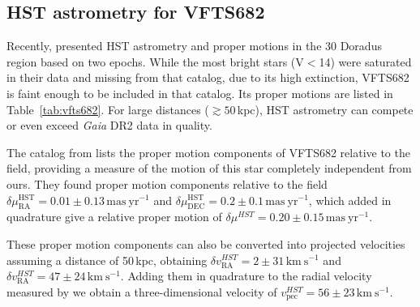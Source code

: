\documentclass[a4paper,fleqn,usenatbib]{mnras}
\newcommand{\kms}{{\,\mathrm{km\ s^{-1}}}}
\DeclareRobustCommand{\Tabref}[1]{Table~\ref{#1}}
\begin{document}
\subsection{HST astrometry for VFTS682}
Recently, \citet{platais:18} presented HST  astrometry and proper
motions in the 30 Doradus region based on two epochs. %
While the most bright stars (V$<$14) were saturated in
their data and missing from that catalog, due to its
high extinction, VFTS682 is faint enough
to be included in that catalog. Its proper motions are
listed in \Tabref{tab:vfts682}. For
large distances ($\gtrsim50$\,kpc), HST astrometry can compete or even
exceed \emph{Gaia} DR2 data in quality.

The catalog from \citet{platais:18} lists the proper motion
components of VFTS682 relative to the field, providing a
measure of the motion of this star completely independent from
ours. They found proper
motion components relative to the field
$\delta\mu_\mathrm{RA}^\mathrm{HST} = 0.01\pm0.13\,\mathrm{mas\
  yr^{-1}}$ and
$\delta\mu_\mathrm{DEC}^\mathrm{HST}=0.2\pm0.1\,\mathrm{mas\
  yr^{-1}}$, which added in quadrature give a relative proper motion of
$\delta \mu^{HST} =0.20 \pm 0.15\,\mathrm{mas\ yr^{-1}}$.

These proper motion components can also be converted into projected
velocities assuming a distance of 50\,kpc, obtaining $\delta
v_\mathrm{RA}^{HST}=2\pm31\kms$ and $\delta
v_\mathrm{RA}^{HST}=47\pm24\kms$. %
Adding them in quadrature to the radial velocity
measured by \citet{bestenlehner:11} we obtain a three-dimensional velocity of
$v_\mathrm{pec}^{HST}=56 \pm 23  \kms$.
\end{document}
